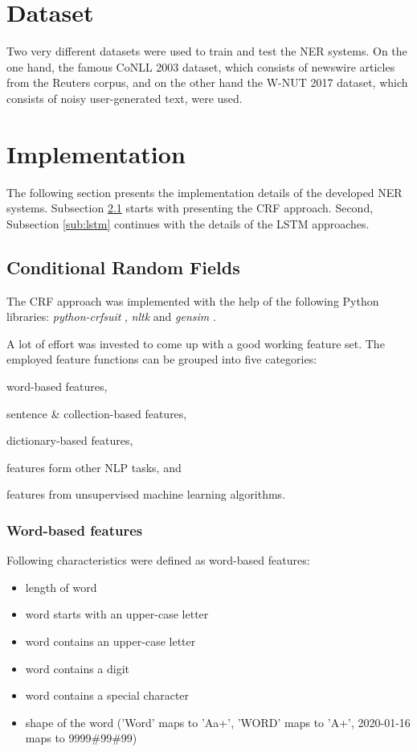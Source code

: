 \documentclass[12pt]{book}
\begin{document}
	\section{Dataset}
	
	Two very different datasets were used to train and test the NER systems. On the one hand, the famous CoNLL 2003 \cite{sang2003introduction} dataset, which consists of newswire articles from the Reuters corpus, and on the other hand the W-NUT 2017 \cite{derczynski2017results} dataset, which consists of noisy user-generated text, were used.
	
	\section{Implementation}
	
	The following section presents the implementation details of the developed NER systems. Subsection \ref{sub:CRF} starts with presenting the CRF approach. Second, Subsection \ref{sub:lstm} continues with the details of the LSTM approaches.
	
	\subsection{Conditional Random Fields}
	\label{sub:CRF}
	
	The CRF approach was implemented with the help of the following Python libraries: \textit{python-crfsuit} \cite{pycrfsuite}, \textit{nltk} \cite{nltk} and \textit{gensim} \cite{gensim}.
	
	A lot of effort was invested to come up with a good working feature set. The employed feature functions can be grouped into five categories: \begin{enumerate*}
		\item word-based features,
		\item sentence \& collection-based features,
		\item dictionary-based features, 
		\item features form other NLP tasks, and
		\item features from unsupervised machine learning algorithms.
	\end{enumerate*}

	\subsubsection{Word-based features}
	
	Following characteristics were defined as word-based features:
	\begin{itemize}
		\item length of word
		\item word starts with an upper-case letter
		\item word contains an upper-case letter
		\item word contains a digit
		\item word contains a special character
		\item shape of the word ('Word' maps to 'Aa+', 'WORD' maps to 'A+', 2020-01-16 maps to 9999\#99\#99)
	\end{itemize}
	
\end{document}
